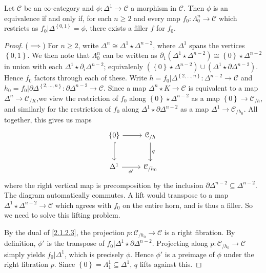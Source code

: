 \begin{proposition}\label{2.1.2.4}
	Let $\mathcal{C} $ be an $\infty $-category  and $\phi : \Delta ^1 \to \mathcal{C} $ a morphism in $\mathcal{C} $. Then $\phi $ is an equivalence if and only if, for each $n\geq 2$ and every map $f_0 : \Lambda _0^n \to \mathcal{C} $ which restricts as $f_0|\Delta ^{\left\{ 0,1 \right\} } =\phi $, there exists a filler $f$ for $f_0$.
\end{proposition}
\begin{proof}
	($\implies$) For $n\geq 2$, write $\Delta ^n \cong \Delta ^1 \star \Delta ^{n-2} $, where $\Delta ^1 $ spans the vertices $\left\{ 0,1 \right\} $. We then note that $\Lambda _0^n$ can be written as $\partial_1(\Delta ^1 \star \Delta ^{n-2} ) \cong \left\{ 0 \right\} \star \Delta ^{n-2} $ in union with each $\Delta ^1 \star \partial _i \Delta ^{n-2} $; equivalenly $(\left\{ 0 \right\} \star  \Delta ^{n-2} )\cup (\Delta ^1 \star \partial \Delta ^{n-2} )$. Hence $f_0$ factors through each of these. Write $h=f_0|\Delta ^{\left\{ 2, \ldots ,n \right\} } : \Delta ^{n-2}  \to \mathcal{C} $ and $h_0 = f_0|\partial \Delta ^{\left\{ 2, \ldots ,n \right\} } : \partial \Delta ^{n-2}  \to \mathcal{C} $. Since a map $\Delta ^n \star K\to \mathcal{C} $ is equivalent to a map $\Delta ^n \to \mathcal{C} _{/K} $,we view the restriction of $f_0$ along $\left\{ 0 \right\} \star \Delta ^{n-2} $ as a map $\left\{ 0 \right\} \to \mathcal{C} _{/h}$, and similarly for the restriction of $f_0$ along $\Delta ^1 \star \partial \Delta ^{n-2} $ as a map $\Delta ^1 \to \mathcal{C} _{/h_0} $. All together, this gives us maps
	\[\begin{tikzcd}[row sep = 2.5em, column sep = 2.5em]
	\left\{ 0 \right\} \ar[hook, d] \ar[r]  & \mathcal{C} _{/h} \ar[" q ", d]  \\
	\Delta ^1 \ar[" \phi ' "', r]  & \mathcal{C} _{/h_0} 
	\end{tikzcd}\]
	where the right vertical map is precomposition by the inclusion $\partial \Delta ^{n-2} \subseteq \Delta ^{n-2} $. The diagram automatically commutes. A lift would transpose to a map $\Delta ^1 \star \Delta ^{n-2} \to \mathcal{C} $ which agrees with $f_0$ on the entire horn, and is thus a filler. So we need to solve this lifting problem.

	By the dual of \cref{2.1.2.3}, the projection $p : \mathcal{C} _{/h_0}  \to \mathcal{C} $ is a right fibration. By definition, $\phi '$ is the transpose of $f_0 | \Delta ^1 \star \partial \Delta ^{n-2} $. Projecting along $p: \mathcal{C} _{/h_0}  \to \mathcal{C} $ simply yields $f_0|\Delta ^1$, which is precisely $\phi $. Hence $\phi '$ is a preimage of $\phi $ under the right fibration $p$. Since $\left\{ 0 \right\} =\Lambda_1^1 \subseteq \Delta ^1$, $q$ lifts against this.


\end{proof}
